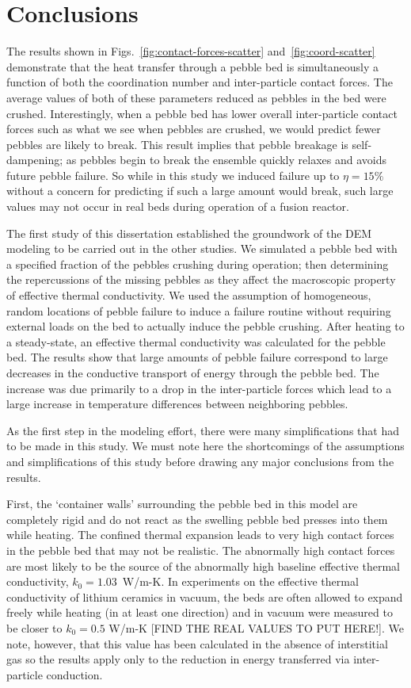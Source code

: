 \section{Conclusions}
\label{sec:dem-conclusions}
The results shown in Figs.~\ref{fig:contact-forces-scatter} and~\ref{fig:coord-scatter} demonstrate that the heat transfer through a pebble bed is simultaneously a function of both the coordination number and inter-particle contact forces. The average values of both of these parameters reduced as pebbles in the bed were crushed. Interestingly, when a pebble bed has lower overall inter-particle contact forces such as what we see when pebbles are crushed, we would predict fewer pebbles are likely to break. This result implies that pebble breakage is self-dampening; as pebbles begin to break the ensemble quickly relaxes and avoids future pebble failure. So while in this study we induced failure up to $\eta = 15\%$ without a concern for predicting if such a large amount would break, such large values may not occur in real beds during operation of a fusion reactor. 

The first study of this dissertation established the groundwork of the DEM modeling to be carried out in the other studies. We simulated a pebble bed with a specified fraction of the pebbles crushing during operation; then determining the repercussions of the missing pebbles as they affect the macroscopic property of effective thermal conductivity. We used the assumption of homogeneous, random locations of pebble failure to induce a failure routine without requiring external loads on the bed to actually induce the pebble crushing. After heating to a steady-state, an effective thermal conductivity was calculated for the pebble bed. The results show that large amounts of pebble failure correspond to large decreases in the conductive transport of energy through the pebble bed. The increase was due primarily to a drop in the inter-particle forces which lead to a large increase in temperature differences between neighboring pebbles. 

As the first step in the modeling effort, there were many simplifications that had to be made in this study. We must note here the shortcomings of the assumptions and simplifications of this study before drawing any major conclusions from the results.

First, the `container walls' surrounding the pebble bed in this model are completely rigid and do not react as the swelling pebble bed presses into them while heating. The confined thermal expansion leads to very high contact forces in the pebble bed that may not be realistic. The abnormally high contact forces are most likely to be the source of the abnormally high baseline effective thermal conductivity, $k_0 = 1.03$~W/m-K. In experiments on the effective thermal conductivity of lithium ceramics in vacuum, the beds are often allowed to expand freely while heating (in at least one direction) and in vacuum were measured to be closer to $k_0 = 0.5$ W/m-K [FIND THE REAL VALUES TO PUT HERE!]. We note, however, that this value has been calculated in the absence of interstitial gas so the results apply only to the reduction in energy transferred via inter-particle conduction.


